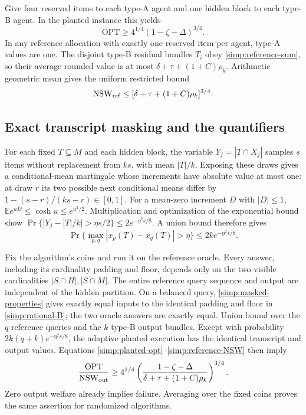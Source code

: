 Give four reserved items to each type-A agent and one hidden block
to each type-B agent.  In the planted instance this yields
\begin{equation}\label{simp:planted-opt}
       \mathrm{OPT}\ge4^{1/4}(1-\zeta-\Delta)^{3/4}.
\end{equation}
In any reference allocation with exactly one reserved item per
agent, type-A values are one.  The disjoint type-B residual bundles
$T_i$ obey \eqref{simp:reference-sum}, so their average rounded
value is at most $\delta+\tau+(1+C)\rho_k$.
Arithmetic--geometric mean gives the uniform restricted bound
\begin{equation}\label{simp:reference-NSW}
       \mathrm{NSW}_{\rm ref}\le
                  [\delta+\tau+(1+C)\rho_k]^{3/4}.
\end{equation}

\subsection{Exact transcript masking and the quantifiers}

For each fixed $T\subseteq M$ and each hidden block, the variable
$Y_j=|T\cap X_j|$ samples $s$ items without replacement from $ks$,
with mean $|T|/k$.  Exposing these draws gives a conditional-mean
martingale whose increments have absolute value at most one: at
draw $r$ its two possible next conditional means differ by
$1-(s-r)/(ks-r)\in[0,1]$.
For a mean-zero increment $D$ with $|D|\le1$,
$\mathbb E e^{uD}\le\cosh u\le e^{u^2/2}$.
Multiplication and optimization of the exponential bound show
$\Pr\{|Y_j-|T|/k|>\eta s/2\}\le2e^{-\eta^2s/8}$.
A union bound therefore gives
\[
 \Pr\{\max_{p,q}|x_p(T)-x_q(T)|>\eta\}
                  \le2k e^{-\eta^2s/8}.
\]

Fix the algorithm's coins and run it on the reference oracle.
Every answer, including its cardinality padding and floor, depends
only on the two visible cardinalities $|S\cap H|,|S\cap M|$.
The entire reference query sequence and output are independent of
the hidden partition.  On a balanced query, \eqref{simp:masked-properties}
gives exactly equal inputs to the identical padding and floor in
\eqref{simp:rational-B}; the two oracle answers are exactly equal.
Union bound over the $q$ reference queries and the $k$ type-B
output bundles.  Except with probability
$2k(q+k)e^{-\eta^2s/8}$, the adaptive planted execution has the
identical transcript and output values.  Equations
\eqref{simp:planted-opt}--\eqref{simp:reference-NSW} then imply
\[
 \frac{\mathrm{OPT}}{\mathrm{NSW}_{\rm out}}\ge
 4^{1/4}\left(\frac{1-\zeta-\Delta}
                   {\delta+\tau+(1+C)\rho_k}\right)^{3/4}.
\]
Zero output welfare already implies failure.  Averaging over the
fixed coins proves the same assertion for randomized algorithms.

